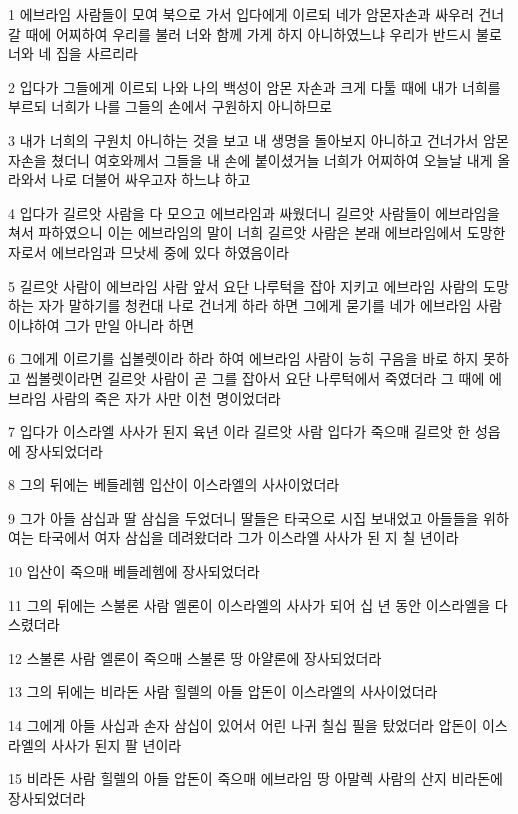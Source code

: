 \par 1 에브라임 사람들이 모여 북으로 가서 입다에게 이르되 네가 암몬자손과 싸우러 건너갈 때에 어찌하여 우리를 불러 너와 함께 가게 하지 아니하였느냐 우리가 반드시 불로 너와 네 집을 사르리라
\par 2 입다가 그들에게 이르되 나와 나의 백성이 암몬 자손과 크게 다툴 때에 내가 너희를 부르되 너희가 나를 그들의 손에서 구원하지 아니하므로
\par 3 내가 너희의 구원치 아니하는 것을 보고 내 생명을 돌아보지 아니하고 건너가서 암몬 자손을 쳤더니 여호와께서 그들을 내 손에 붙이셨거늘 너희가 어찌하여 오늘날 내게 올라와서 나로 더불어 싸우고자 하느냐 하고
\par 4 입다가 길르앗 사람을 다 모으고 에브라임과 싸웠더니 길르앗 사람들이 에브라임을 쳐서 파하였으니 이는 에브라임의 말이 너희 길르앗 사람은 본래 에브라임에서 도망한 자로서 에브라임과 므낫세 중에 있다 하였음이라
\par 5 길르앗 사람이 에브라임 사람 앞서 요단 나루턱을 잡아 지키고 에브라임 사람의 도망하는 자가 말하기를 청컨대 나로 건너게 하라 하면 그에게 묻기를 네가 에브라임 사람이냐하여 그가 만일 아니라 하면
\par 6 그에게 이르기를 십볼렛이라 하라 하여 에브라임 사람이 능히 구음을 바로 하지 못하고 씹볼렛이라면 길르앗 사람이 곧 그를 잡아서 요단 나루턱에서 죽였더라 그 때에 에브라임 사람의 죽은 자가 사만 이천 명이었더라
\par 7 입다가 이스라엘 사사가 된지 육년 이라 길르앗 사람 입다가 죽으매 길르앗 한 성읍에 장사되었더라
\par 8 그의 뒤에는 베들레헴 입산이 이스라엘의 사사이었더라
\par 9 그가 아들 삼십과 딸 삼십을 두었더니 딸들은 타국으로 시집 보내었고 아들들을 위하여는 타국에서 여자 삼십을 데려왔더라 그가 이스라엘 사사가 된 지 칠 년이라
\par 10 입산이 죽으매 베들레헴에 장사되었더라
\par 11 그의 뒤에는 스불론 사람 엘론이 이스라엘의 사사가 되어 십 년 동안 이스라엘을 다스렸더라
\par 12 스불론 사람 엘론이 죽으매 스불론 땅 아얄론에 장사되었더라
\par 13 그의 뒤에는 비라돈 사람 힐렐의 아들 압돈이 이스라엘의 사사이었더라
\par 14 그에게 아들 사십과 손자 삼십이 있어서 어린 나귀 칠십 필을 탔었더라 압돈이 이스라엘의 사사가 된지 팔 년이라
\par 15 비라돈 사람 힐렐의 아들 압돈이 죽으매 에브라임 땅 아말렉 사람의 산지 비라돈에 장사되었더라

